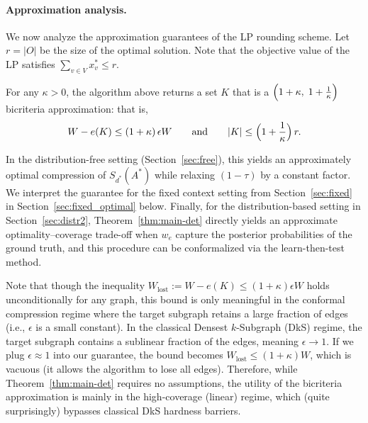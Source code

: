 \paragraph{Approximation analysis.}
We now analyze the approximation guarantees of the LP rounding scheme. Let $r = |O|$ be the size of the optimal solution. %
Note that the objective value of the LP satisfies $\sum_{v \in V} x^*_v \le r$.

\begin{theorem}
\label{thm:main-det}
For any $\kappa>0$, the algorithm above returns a set $K$ that is a $\Bigl(1+\kappa,\;1+\frac{1}{\kappa}\Bigr)$ bicriteria approximation: that is,
\[
W - e(K) \le (1+\kappa)\,\epsilon W
\qquad\text{and}\qquad
|K| \le \Bigl(1+\frac{1}{\kappa}\Bigr)\,r.
\]
\end{theorem}

In the distribution-free setting (Section~\ref{sec:free}), this yields an approximately optimal compression of $S_{d^*}(A^*)$ while relaxing $(1-\tau)$ by a constant factor.  We interpret the guarantee for the fixed context setting from Section~\ref{sec:fixed} in Section~\ref{sec:fixed_optimal} below. Finally, for the distribution-based setting in Section~\ref{sec:distr2}, Theorem~\ref{thm:main-det} directly yields an approximate optimality--coverage trade-off when $w_e$ capture the posterior probabilities of the ground truth, and this procedure can be conformalized via the learn-then-test method.

Note that though the inequality $W_{\text{lost}} := W - e(K) \le (1+\kappa)\epsilon W$ holds unconditionally for any graph, this bound is only meaningful in the conformal compression regime where the target subgraph retains a large fraction of edges (i.e., $\epsilon$ is a small constant). In the classical Densest $k$-Subgraph (DkS) regime, the target subgraph contains a sublinear fraction of the edges, meaning $\epsilon \to 1$. If we plug $\epsilon \approx 1$ into our guarantee, the bound becomes $W_{\text{lost}} \le (1+\kappa)W$, which is vacuous (it allows the algorithm to lose all edges). Therefore, while Theorem~\ref{thm:main-det} requires no assumptions, the utility of the bicriteria approximation is mainly in the high-coverage (linear) regime, which (quite surprisingly) bypasses classical DkS hardness barriers. 

